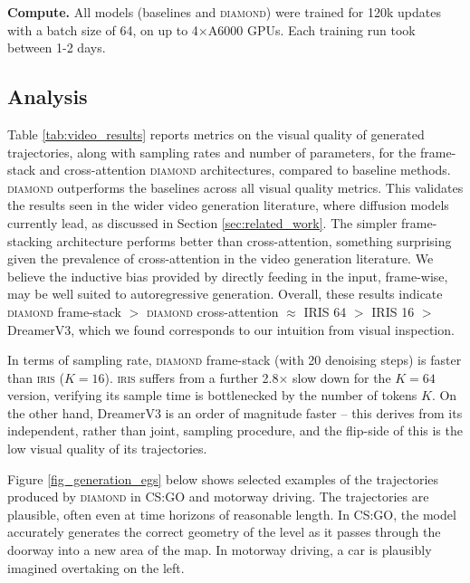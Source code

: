 \textbf{Compute.}
All models (baselines and \textsc{diamond}) were trained for 120k updates with a batch size of 64, on up to 4$\times$A6000 GPUs. Each training run took between 1-2 days.

\subsection{Analysis}



Table \ref{tab:video_results} reports metrics on the visual quality of generated trajectories, along with sampling rates and number of parameters, for the frame-stack and cross-attention \textsc{diamond} architectures, compared to baseline methods. 
\textsc{diamond} outperforms the baselines across all visual quality metrics. 
This validates the results seen in the wider video generation literature, where diffusion models currently lead, as discussed in Section \ref{sec:related_work}.
The simpler frame-stacking architecture performs better than cross-attention, something surprising given the prevalence of cross-attention in the video generation literature. We believe the inductive bias provided by directly feeding in the input, frame-wise, may be well suited to autoregressive generation. Overall, these results indicate \textsc{diamond} frame-stack $>$ \textsc{diamond} cross-attention $\approx$ IRIS 64 $>$ IRIS 16 $>$ DreamerV3, which we found corresponds to our intuition from visual inspection.

In terms of sampling rate, \textsc{diamond} frame-stack (with 20 denoising steps) is faster than \textsc{iris} ($K=16$). \textsc{iris} suffers from a further 2.8$\times$ slow down for the $K=64$ version, verifying its sample time is bottlenecked by the number of tokens $K$.
On the other hand, DreamerV3 is an order of magnitude faster -- this derives from its independent, rather than joint, sampling procedure, and the flip-side of this is the low visual quality of its trajectories. 

\newpage


Figure \ref{fig_generation_egs} below shows selected examples of the trajectories produced by \textsc{diamond} in CS:GO and motorway driving.
The trajectories are plausible, often even at time horizons of reasonable length. In CS:GO, the model accurately generates the correct geometry of the level as it passes through the doorway into a new area of the map. In motorway driving, a car is plausibly imagined overtaking on the left.

